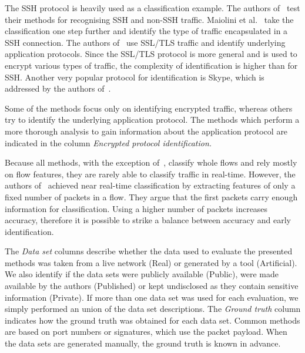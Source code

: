 The SSH protocol is heavily used as a classification example. The authors of~\cite{Alshammari-2009-Classifying, Alshammari-2007-flow, Alshammari-2009-Preliminary, Alshammari-2009-Machine, Alshammari-2011-Can, Arndt-2011-Comparison, Bacquet-2009-Investigation, Bacquet-2011-Genetic, Zhang-2013-Encrypted} test their methods for recognising SSH and non-SSH traffic. Maiolini et al.~\cite{Maiolini-2009-Real} take the classification one step further and identify the type of traffic encapsulated in a SSH connection. The authors of~\cite{Bernaille-2007-Early, Korczynski-2014-Markov, Sun-2010-Novel} use SSL/TLS traffic and identify underlying application protocols. Since the SSL/TLS protocol is more general and is used to encrypt various types of traffic, the complexity of identification is higher than for SSH. Another very popular protocol for identification is Skype, which is addressed by the authors of~\cite{Alshammari-2009-Machine, Alshammari-2011-Can, Korczynski-2012-Classifying, Korczynski-2014-Markov}.

Some of the methods focus only on identifying encrypted traffic, whereas others try to identify the underlying application protocol. The methods which perform a more thorough analysis to gain information about the application protocol are indicated in the column \emph{Encrypted protocol identification.}

Because all methods, with the exception of~\cite{Karagiannis-2005-BLINC}, classify whole flows and rely mostly on flow features, they are rarely able to classify traffic in real-time. However, the authors of~\cite{BarYanai-2010-Realtime, Bernaille-2007-Early, Kumano-2014-Towards, Maiolini-2009-Real, Wang-2011-Using} achieved near real-time classification by extracting features of only a fixed number of packets in a flow. They argue that the first packets carry enough information for classification. Using a higher number of packets increases accuracy, therefore it is possible to strike a balance between accuracy and early identification.

The \emph{Data set} columns describe whether the data used to evaluate the presented methods was taken from a live network (Real) or generated by a tool (Artificial). We also identify if the data sets were publicly available (Public), were made available by the authors (Published) or kept undisclosed as they contain sensitive information (Private). If more than one data set was used for each evaluation, we simply performed an union of the data set descriptions. The \emph{Ground truth} column indicates how the ground truth was obtained for each data set. Common methods are based on port numbers or signatures, which use the packet payload. When the data sets are generated manually, the ground truth is known in advance.

